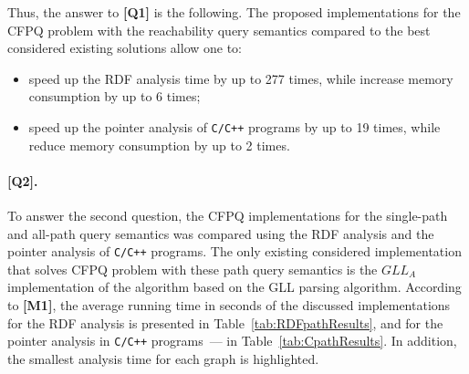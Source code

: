Thus, the answer to \textbf{[Q1]} is the following. The proposed implementations for the CFPQ problem with the reachability query semantics compared to the best considered existing solutions allow one to:
\begin{itemize}
    \item speed up the RDF analysis time by up to 277 times, while increase memory consumption by up to 6 times;
    \item speed up the pointer analysis of \texttt{C/C++} programs by up to 19 times, while reduce memory consumption by up to 2 times.
\end{itemize}

\paragraph{[Q2].} To answer the second question, the CFPQ implementations for the single-path and all-path query semantics was compared using the RDF analysis and the pointer analysis of \texttt{C/C++} programs. The only existing considered implementation that solves CFPQ problem with these path query semantics is the $\textit{GLL}_{\textit{A}}$ implementation of the algorithm based on the GLL parsing algorithm. According to \textbf{[M1]}, the average running time in seconds of the discussed implementations for the RDF analysis is presented in Table~\ref{tab:RDFpathResults}, and for the pointer analysis in \texttt{C/C++} programs~--- in Table~\ref{tab:CpathResults}. In addition, the smallest analysis time for each graph is highlighted.

